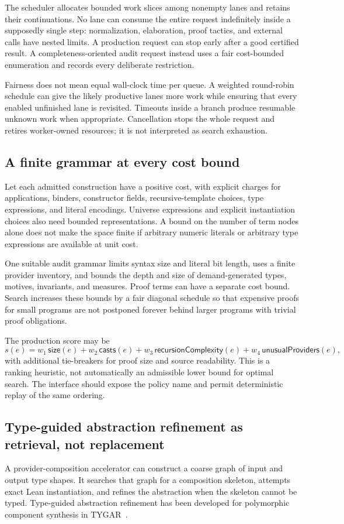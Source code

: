 The scheduler allocates bounded work slices among nonempty lanes and retains their continuations. No lane can consume the entire request indefinitely inside a supposedly single step: normalization, elaboration, proof tactics, and external calls have nested limits. A production request can stop early after a good certified result. A completeness-oriented audit request instead uses a fair cost-bounded enumeration and records every deliberate restriction.

Fairness does not mean equal wall-clock time per queue. A weighted round-robin schedule can give the likely productive lanes more work while ensuring that every enabled unfinished lane is revisited. Timeouts inside a branch produce resumable unknown work when appropriate. Cancellation stops the whole request and retires worker-owned resources; it is not interpreted as search exhaustion.

\subsection{A finite grammar at every cost bound}
Let each admitted construction have a positive cost, with explicit charges for applications, binders, constructor fields, recursive-template choices, type expressions, and literal encodings. Universe expressions and explicit instantiation choices also need bounded representations. A bound on the number of term nodes alone does not make the space finite if arbitrary numeric literals or arbitrary type expressions are available at unit cost.

One suitable audit grammar limits syntax size and literal bit length, uses a finite provider inventory, and bounds the depth and size of demand-generated types, motives, invariants, and measures. Proof terms can have a separate cost bound. Search increases these bounds by a fair diagonal schedule so that expensive proofs for small programs are not postponed forever behind larger programs with trivial proof obligations.

The production score may be
\[
 s(e)=w_1\,\mathsf{size}(e)+w_2\,\mathsf{casts}(e)
      +w_3\,\mathsf{recursionComplexity}(e)+w_4\,\mathsf{unusualProviders}(e),
\]
with additional tie-breakers for proof size and source readability. This is a ranking heuristic, not automatically an admissible lower bound for optimal search. The interface should expose the policy name and permit deterministic replay of the same ordering.

\subsection{Type-guided abstraction refinement as retrieval, not replacement}
A provider-composition accelerator can construct a coarse graph of input and output type shapes. It searches that graph for a composition skeleton, attempts exact Lean instantiation, and refines the abstraction when the skeleton cannot be typed. Type-guided abstraction refinement has been developed for polymorphic component synthesis in TYGAR~\cite{tygar}.

